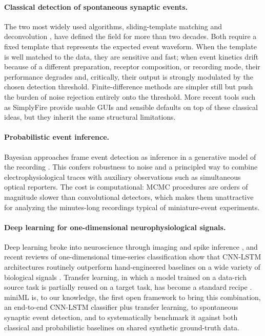 \documentclass[11pt]{article}
\begin{document}
\paragraph{Classical detection of spontaneous synaptic events.}
The two most widely used algorithms, sliding-template matching
\citep{clements1997detection} and deconvolution
\citep{pernia2012deconvolution}, have defined the field for more than two
decades. Both require a fixed template that represents the expected event
waveform. When the template is well matched to the data, they are sensitive
and fast; when event kinetics drift because of a different preparation,
receptor composition, or recording mode, their performance degrades and,
critically, their output is strongly modulated by the chosen detection
threshold. Finite-difference methods \citep{kudoh2002template} are simpler
still but push the burden of noise rejection entirely onto the threshold.
More recent tools such as SimplyFire \citep{mori2024simplyfire} provide
usable GUIs and sensible defaults on top of these classical ideas, but they
inherit the same structural limitations.

\paragraph{Probabilistic event inference.}
Bayesian approaches frame event detection as inference in a generative model
of the recording \citep{merel2016bayesian}. This confers robustness to noise
and a principled way to combine electrophysiological traces with auxiliary
observations such as simultaneous optical reporters. The cost is
computational: MCMC procedures are orders of magnitude slower than
convolutional detectors, which makes them unattractive for analyzing the
minutes-long recordings typical of miniature-event experiments.

\paragraph{Deep learning for one-dimensional neurophysiological signals.}
Deep learning broke into neuroscience through imaging and spike inference
\citep{lecun2015deep, rupprecht2021cascade}, and recent reviews of
one-dimensional time-series classification show that CNN-LSTM architectures
routinely outperform hand-engineered baselines on a wide variety of biological
signals \citep{fawaz2019deeptsc}. Transfer learning, in which a model trained
on a data-rich source task is partially reused on a target task, has become a
standard recipe \citep{yosinski2014transferable, theodoris2023transfer}.
miniML is, to our knowledge, the first open framework to bring this
combination, an end-to-end CNN-LSTM classifier plus transfer learning, to
spontaneous synaptic event detection, and to systematically benchmark it
against both classical and probabilistic baselines on shared synthetic
ground-truth data.
\end{document}
